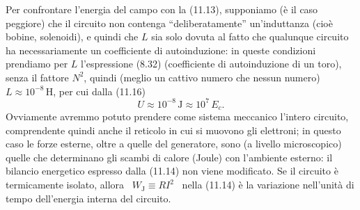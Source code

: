 \begin{enumerate}
    Per confrontare l'energia del campo con la (11.13), supponiamo (\`e il caso
    peggiore) che il circuito non contenga ``deliberatamente'' un'induttanza
    (cio\`e bobine, solenoidi), e quindi che $L$ sia solo dovuta al fatto che
    qualunque circuito ha necessariamente un coefficiente di autoinduzione: in
    queste condizioni prendiamo per $L$ l'espressione (8.32) (coefficiente di
    autoinduzione di un toro), senza il fattore $N^2$, quindi (meglio un cattivo
    numero che nessun numero) $L\approx10^{-8}$\,H, per cui dalla (11.16)
    \begin{equation}
      U\approx10^{-8}\,\mathrm{J}\approx10^7\,E_c.
      \tag{11.17}
    \end{equation}
    Ovviamente avremmo potuto prendere come sistema meccanico l'intero circuito,
    comprendente quindi anche il reticolo in cui si muovono gli elettroni; in
    questo caso le forze esterne, oltre a quelle del generatore, sono (a livello
    microscopico) quelle che determinano gli scambi di calore (Joule) con
    l'ambiente esterno: il bilancio energetico espresso dalla (11.14) non viene
    modificato. Se il circuito \`e
    termicamente isolato, allora \ $W_\mathrm{J}\equiv RI^2$ \ nella (11.14) \`e
    la variazione nell'unit\`a di tempo dell'energia interna del circuito.


\end{enumerate}
